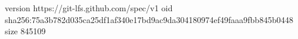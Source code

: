 version https://git-lfs.github.com/spec/v1
oid sha256:75a3b782d035ca25df1af340e17bd9ac9da304180974ef49faaa9fbb845b0448
size 845109
